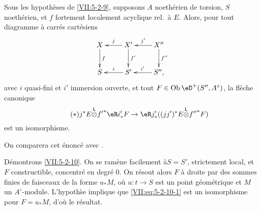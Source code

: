\begin{proposition}\label{VII:5-2-10}
Sous les hypoth\`eses de \ref{VII:5-2-9}, supposons $A$ noeth\'erien de 
torsion, $S$ noeth\'erien, et $f$ fortement localement acyclique rel.\ \`a $E$. 
Alors, pour tout diagramme \`a carr\'es cart\'esiens 
\[\xymatrix{
  X \ar[d]^-f 
    & \ar[l]_-j X' \ar[d]^-{f'} 
    & \ar[l]_-{j'} X'' \ar[d]^-{f''} \\
  S 
    & \ar[l]_-i S' 
    & \ar[l]_-{i'} S'' \text{,} 
}\]
avec $i$ quasi-fini et $i'$ immersion ouverte, et tout 
$F\in\ob\eD^+(S'',A^\circ)$, la fl\`eche canonique 
\begin{equation*}\tag{$*$}\label{VII:eq:5-2-10-1}
  j^\ast E \lotimes {f'}^\ast \eR i_\ast' F \to \eR j_\ast' ((j j')^\ast E\lotimes {f''}^\ast F) 
\end{equation*}
est un isomorphisme. 
\end{proposition}

On comparera cet \'enonc\'e avec \cite[XV 1.17]{sga4}. 

D\'emontrons \ref{VII:5-2-10}. On se ram\`ene facilement \`a$S=S'$, 
strictement local, et $F$ constructible, concentr\'e en degr\'e $0$. On 
r\'esout alors $F$ \`a droite par des sommes finies de faisceaux de la forme 
$u_\ast M$, o\`u $u:t\to S$ est un point g\'eom\'etrique et $M$ un 
$A^\circ$-module. L'hypoth\`se implique que \eqref{VII:eq:5-2-10-1} est un 
isomorphisme pour $F=u_\ast M$, d'o\`u le r\'esultat. 



